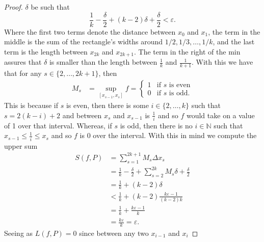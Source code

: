 \documentclass[12pt]{article}
\begin{document}
\begin{enumerate}
\begin{proof}
                $\delta$ be such that 
                \begin{equation*}
                    \frac{1}{k}-\frac{\delta}{2}+(k-2)\delta+\frac{\delta}{2}<\varepsilon.
                \end{equation*}
                Where the first two terms denote the distance between $x_0$ and
                $x_1$, the term in the middle is the sum of the rectangle's
                widths around $1/2, 1/3, \dots, 1/k$, and the last term is the
                length between $x_{2k}$ and $x_{2k+1}$. The term in the right 
                of the min assures that $\delta$ is
                smaller than the length between $\frac{1}{k}$ and
                $\frac{1}{k+1}$. With this we have that 
                for any $s\in\{2, \dots, 2k+1\}$, then 
                \begin{align*}
                    M_s&=\sup_{[x_{s-1}, x_s]}f=\begin{cases}
                        1 &\text{if $s$ is even} \\
                        0 &\text{if $s$ is odd.}
                    \end{cases}
                \end{align*}
                This is because if $s$ is even, then there is some $i\in\{2,
                \dots, k\}$ such that $s=2(k-i)+2$ and between $x_s$ and
                $x_{s-1}$ is $\frac{1}{i}$ and so $f$ would take on a value of
                1 over that interval. Whereas, if $s$ is odd, then there is no
                $i\in\mathbb{N}$ such that $x_{s-1}\leq\frac{1}{i}\leq x_s$ and
                so $f$ is 0 over the interval. With this in mind we compute the
                upper sum 
                \begin{align*}
                    S(f, P)&=\sum_{s=1}^{2k+1}M_s\Delta x_s \\
                    &=\frac{1}{k}-\frac{\delta}{2}+\sum_{s=2}^{2k}M_s\delta+\frac{\delta}{2}
                    \\
                    &=\frac{1}{k}+(k-2)\delta \\
                    &< \frac{1}{k}+(k-2)\frac{k\varepsilon-1}{(k-2)k} \\
                    &= \frac{1}{k}+\frac{k\varepsilon-1}{k} \\
                    &=\frac{k\varepsilon}{k}=\varepsilon.
                \end{align*}
                Seeing as $L(f, P)=0$ since between any two $x_{i-1}$ and $x_i$

\end{proof}
\end{enumerate}
\end{document}
